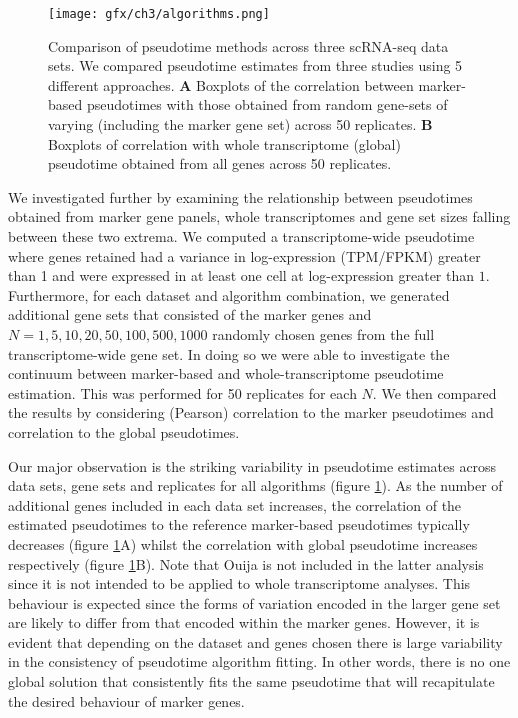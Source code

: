 \begin{figure}%
	\centering
	\texttt{[image: gfx/ch3/algorithms.png]}
	\caption[Comparison of pseudotime methods across three scRNA-seq data sets.]{Comparison of pseudotime methods across three scRNA-seq data sets. We compared pseudotime estimates from three studies \cite{Shin2015,Trapnell2014-xi,zhou2016tracing} using 5 different approaches. \textbf{A} Boxplots of the correlation between marker-based pseudotimes with those obtained from random gene-sets of varying (including the marker gene set) across 50 replicates. \textbf{B} Boxplots of correlation with whole transcriptome (global) pseudotime obtained from all genes across 50 replicates.}
	\label{fig:comparisons}
\end{figure}

We investigated further by examining the relationship between pseudotimes obtained from marker gene panels, whole transcriptomes and gene set sizes falling between these two extrema. We computed a transcriptome-wide pseudotime where genes retained had a variance in log-expression (TPM/FPKM) greater than 1 and were expressed in at least one cell at log-expression greater than $1$. Furthermore, for each dataset and algorithm combination, we generated additional gene sets that consisted of the marker genes and\\
 $N = 1, 5, 10, 20, 50, 100, 500, 1000$ randomly chosen genes from the full transcriptome-wide gene set. In doing so we were able to investigate the continuum between marker-based and whole-transcriptome pseudotime estimation. This was performed for 50 replicates for each $N$. We then compared the results by considering (Pearson) correlation to the marker pseudotimes and correlation to the global pseudotimes.

Our major observation is the striking variability in pseudotime estimates across data sets, gene sets and replicates for all algorithms
(figure \ref{fig:comparisons}). As the number of additional genes included in each data set increases, the correlation of the estimated pseudotimes to the reference marker-based pseudotimes typically decreases (figure \ref{fig:comparisons}A) whilst the correlation with global pseudotime increases respectively (figure \ref{fig:comparisons}B). Note that Ouija is not included in the latter analysis since it is not intended to be applied to whole transcriptome analyses. This behaviour is expected since the forms of variation encoded in the larger gene set are likely to differ from that encoded within the marker genes. However, it is evident that depending on the dataset and genes chosen there is large variability in the consistency of pseudotime algorithm fitting. In other words, there is no one global solution that consistently fits the same pseudotime that will recapitulate the desired behaviour of marker genes.


